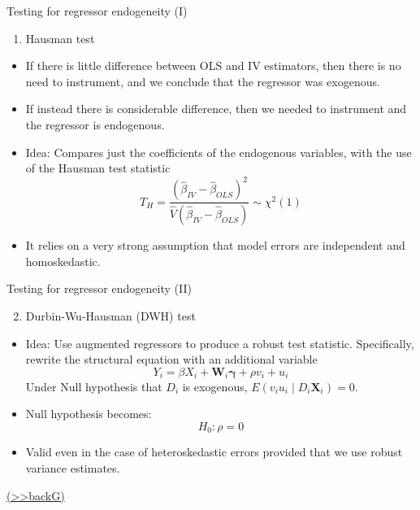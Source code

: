 \documentclass[
  10pt,
  ignorenonframetext,
]{beamer}
\providecommand{\tightlist}{%
  \setlength{\itemsep}{0pt}\setlength{\parskip}{0pt}}
\begin{document}
\begin{frame}{Testing for regressor endogeneity (I)}
\protect\hypertarget{review-endog}{}
\begin{enumerate}
\tightlist
\item
  Hausman test
\end{enumerate}

\begin{itemize}
\item
  If there is little difference between OLS and IV estimators, then
  there is no need to instrument, and we conclude that the regressor was
  exogenous.
\item
  If instead there is considerable difference, then we needed to
  instrument and the regressor is endogenous.
\item
  Idea: Compares just the coefficients of the endogenous variables, with
  the use of the Hausman test statistic \[
  T_H = \frac{(\hat\beta_{IV} - \hat\beta_{OLS})^2}{\hat V (\hat\beta_{IV} - \hat\beta_{OLS})} \sim \chi^2(1)
  \]
\item
  It relies on a very strong assumption that model errors are
  independent and homoskedastic.
\end{itemize}
\end{frame}

\begin{frame}{Testing for regressor endogeneity (II)}
\protect\hypertarget{testing-for-regressor-endogeneity-ii}{}
\begin{enumerate}
\setcounter{enumi}{1}
\tightlist
\item
  Durbin-Wu-Hausman (DWH) test
\end{enumerate}

\begin{itemize}
\item
  Idea: Use augmented regressors to produce a robust test statistic.
  Specifically, rewrite the structural equation with an additional
  variable \[
  Y_i = \beta X_i + \mathbf{W}_i\mathbf{\gamma} + \rho v_i + u_i
  \] Under Null hypothesis that \(D_i\) is exogenous,
  \(E(v_iu_i\mid D_i \mathbf{X}_i) = 0\).
\item
  Null hypothesis becomes: \[
  H_0: \rho = 0
  \]
\item
  Valid even in the case of heteroskedastic errors provided that we use
  robust variance estimates.
\end{itemize}

\footnotesize\protect\hyperlink{qa-endog}{(\textgreater\textgreater backG)}
\normalsize
\end{frame}
\end{document}
